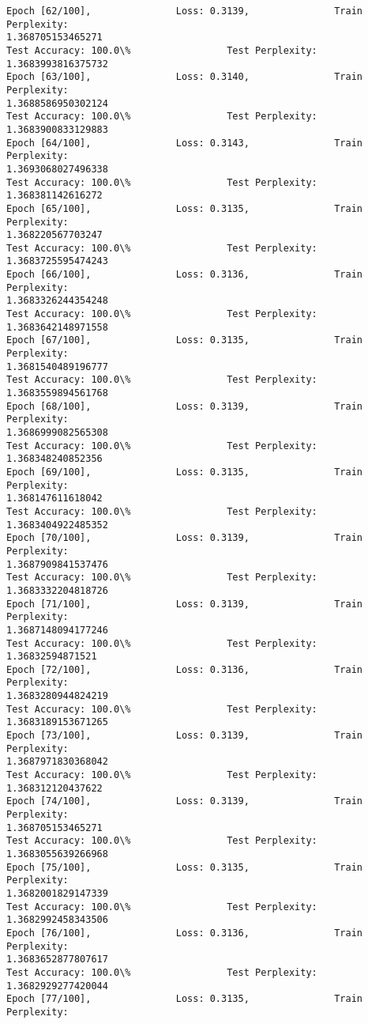 \documentclass[11pt]{article}
\begin{document}
\begin{Verbatim}[commandchars=\\\{\}]
Epoch [62/100],               Loss: 0.3139,               Train Perplexity:
1.368705153465271
Test Accuracy: 100.0\%                 Test Perplexity: 1.3683993816375732
Epoch [63/100],               Loss: 0.3140,               Train Perplexity:
1.3688586950302124
Test Accuracy: 100.0\%                 Test Perplexity: 1.3683900833129883
Epoch [64/100],               Loss: 0.3143,               Train Perplexity:
1.3693068027496338
Test Accuracy: 100.0\%                 Test Perplexity: 1.368381142616272
Epoch [65/100],               Loss: 0.3135,               Train Perplexity:
1.368220567703247
Test Accuracy: 100.0\%                 Test Perplexity: 1.3683725595474243
Epoch [66/100],               Loss: 0.3136,               Train Perplexity:
1.3683326244354248
Test Accuracy: 100.0\%                 Test Perplexity: 1.3683642148971558
Epoch [67/100],               Loss: 0.3135,               Train Perplexity:
1.3681540489196777
Test Accuracy: 100.0\%                 Test Perplexity: 1.3683559894561768
Epoch [68/100],               Loss: 0.3139,               Train Perplexity:
1.3686999082565308
Test Accuracy: 100.0\%                 Test Perplexity: 1.368348240852356
Epoch [69/100],               Loss: 0.3135,               Train Perplexity:
1.368147611618042
Test Accuracy: 100.0\%                 Test Perplexity: 1.3683404922485352
Epoch [70/100],               Loss: 0.3139,               Train Perplexity:
1.3687909841537476
Test Accuracy: 100.0\%                 Test Perplexity: 1.3683332204818726
Epoch [71/100],               Loss: 0.3139,               Train Perplexity:
1.3687148094177246
Test Accuracy: 100.0\%                 Test Perplexity: 1.36832594871521
Epoch [72/100],               Loss: 0.3136,               Train Perplexity:
1.3683280944824219
Test Accuracy: 100.0\%                 Test Perplexity: 1.3683189153671265
Epoch [73/100],               Loss: 0.3139,               Train Perplexity:
1.3687971830368042
Test Accuracy: 100.0\%                 Test Perplexity: 1.368312120437622
Epoch [74/100],               Loss: 0.3139,               Train Perplexity:
1.368705153465271
Test Accuracy: 100.0\%                 Test Perplexity: 1.3683055639266968
Epoch [75/100],               Loss: 0.3135,               Train Perplexity:
1.3682001829147339
Test Accuracy: 100.0\%                 Test Perplexity: 1.3682992458343506
Epoch [76/100],               Loss: 0.3136,               Train Perplexity:
1.3683652877807617
Test Accuracy: 100.0\%                 Test Perplexity: 1.3682929277420044
Epoch [77/100],               Loss: 0.3135,               Train Perplexity:

\end{Verbatim}
\end{document}
